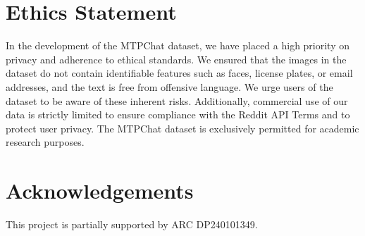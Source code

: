 \section{Ethics Statement}

In the development of the MTPChat dataset, we have placed a high priority on privacy and adherence to ethical standards. We ensured that the images in the dataset do not contain identifiable features such as faces, license plates, or email addresses, and the text is free from offensive language. We urge users of the dataset to be aware of these inherent risks. Additionally, commercial use of our data is strictly limited to ensure compliance with the Reddit API Terms and to protect user privacy. The MTPChat dataset is exclusively permitted for academic research purposes.


\section{Acknowledgements}
This project is partially supported by ARC DP240101349.